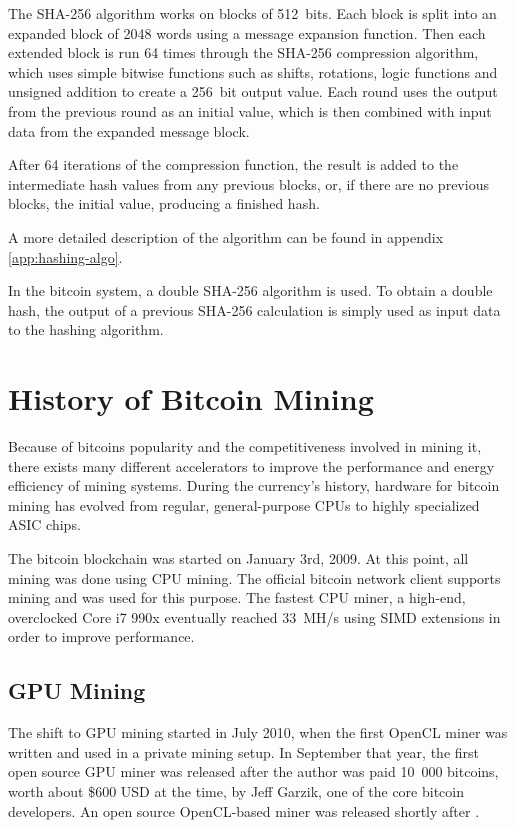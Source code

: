 The SHA-256 algorithm works on blocks of 512~bits. Each block is split into an expanded
block of 2048 words using a message expansion function. Then each extended block is run
64 times through the SHA-256 compression algorithm, which uses simple bitwise functions
such as shifts, rotations, logic functions and unsigned addition to create a 256~bit
output value. Each round uses the output from the previous round as an initial value,
which is then combined with input data from the expanded message block.

After 64 iterations of the compression function, the result is added to the intermediate
hash values from any previous blocks, or, if there are no previous blocks, the initial
value, producing a finished hash.

A more detailed description of the algorithm can be found in appendix \ref{app:hashing-algo}.

In the bitcoin system, a double SHA-256 algorithm is used. To obtain a double hash, the
output of a previous SHA-256 calculation is simply used as input data to the hashing
algorithm.


\section{History of Bitcoin Mining}

Because of bitcoins popularity and the competitiveness involved in mining it, there exists
many different accelerators to improve the performance and energy efficiency of mining systems.
During the currency's history, hardware for bitcoin mining has evolved from regular, general-purpose
CPUs to highly specialized ASIC chips.

The bitcoin blockchain was started on January 3rd, 2009. At this point, all mining was done
using CPU mining. The official bitcoin network client supports mining and was used for this
purpose. The fastest CPU miner, a high-end, overclocked Core i7 990x eventually reached 33~MH/s
using SIMD extensions in order to improve performance. \cite{bitcoin-history}

\subsection{GPU Mining}
The shift to GPU mining started in July 2010, when the first OpenCL miner was written and
used in a private mining setup. In September that year, the first open source GPU miner
was released after the author was paid 10~000 bitcoins, worth about \$600 USD at the time,
by Jeff Garzik, one of the core bitcoin developers. An open source OpenCL-based miner was
released shortly after \cite{bitcoin-history}.

